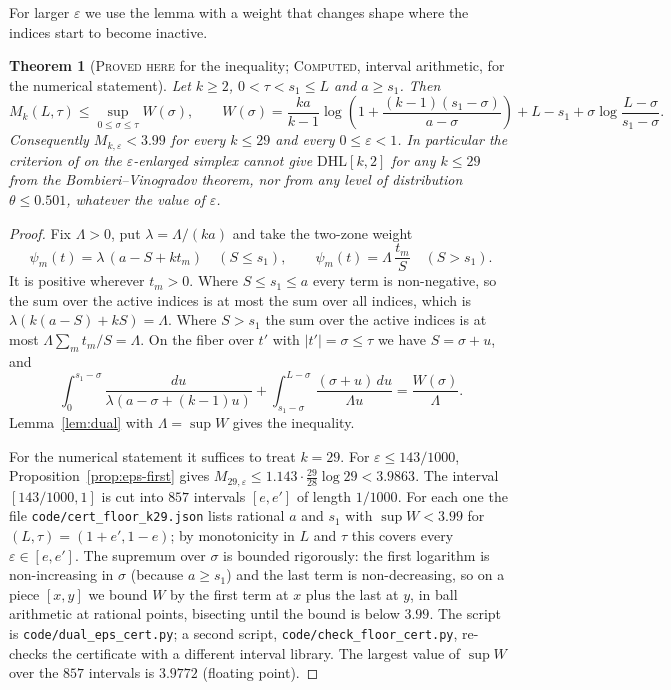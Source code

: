 \documentclass[11pt]{amsart}
\newtheorem{theorem}{Theorem}
\theoremstyle{definition}
\theoremstyle{remark}
\newcommand{\lbl}[1]{\textup{\textsc{#1}}}
\newcommand{\DHL}{\mathrm{DHL}}
\begin{document}
For larger $\varepsilon$ we use the lemma with a weight that changes shape
where the indices start to become inactive.

\begin{theorem}[\lbl{Proved here} for the inequality; \lbl{Computed}, interval arithmetic, for the numerical statement]\label{thm:floor}
Let $k\ge2$, $0<\tau<s_1\le L$ and $a\ge s_1$. Then
\[
M_k(L,\tau)\le\sup_{0\le\sigma\le\tau}W(\sigma),\qquad
W(\sigma)=\frac{ka}{k-1}\log\left(1+\frac{(k-1)(s_1-\sigma)}{a-\sigma}\right)+L-s_1+\sigma\log\frac{L-\sigma}{s_1-\sigma}.
\]
Consequently $M_{k,\varepsilon}<3.99$ for every $k\le29$ and every
$0\le\varepsilon<1$. In particular the criterion of \cite[Thm.~3.12]{Pol14b}
on the $\varepsilon$-enlarged simplex cannot give $\DHL[k,2]$ for any
$k\le29$ from the Bombieri--Vinogradov theorem, nor from any level of
distribution $\theta\le0.501$, whatever the value of $\varepsilon$.
\end{theorem}

\begin{proof}
Fix $\Lambda>0$, put $\lambda=\Lambda/(ka)$ and take the two-zone weight
\[
\psi_m(t)=\lambda\,(a-S+kt_m)\quad(S\le s_1),\qquad
\psi_m(t)=\Lambda\,\frac{t_m}{S}\quad(S>s_1).
\]
It is positive wherever $t_m>0$. Where $S\le s_1\le a$ every term is
non-negative, so the sum over the active indices is at most the sum over all
indices, which is $\lambda(k(a-S)+kS)=\Lambda$. Where $S>s_1$ the sum over the
active indices is at most $\Lambda\sum_mt_m/S=\Lambda$. On the fiber over $t'$
with $|t'|=\sigma\le\tau$ we have $S=\sigma+u$, and
\[
\int_0^{s_1-\sigma}\frac{du}{\lambda(a-\sigma+(k-1)u)}+\int_{s_1-\sigma}^{L-\sigma}\frac{(\sigma+u)\,du}{\Lambda u}=\frac{W(\sigma)}{\Lambda}.
\]
Lemma~\ref{lem:dual} with $\Lambda=\sup W$ gives the inequality.

For the numerical statement it suffices to treat $k=29$. For
$\varepsilon\le143/1000$, Proposition~\ref{prop:eps-first} gives
$M_{29,\varepsilon}\le1.143\cdot\frac{29}{28}\log29<3.9863$. The interval
$[143/1000,1]$ is cut into $857$ intervals $[e,e']$ of length $1/1000$. For
each one the file \texttt{code/cert\_floor\_k29.json} lists rational $a$ and
$s_1$ with $\sup W<3.99$ for $(L,\tau)=(1+e',1-e)$; by monotonicity in $L$ and
$\tau$ this covers every $\varepsilon\in[e,e']$. The supremum over $\sigma$ is
bounded rigorously: the first logarithm is non-increasing in $\sigma$ (because
$a\ge s_1$) and the last term is non-decreasing, so on a piece $[x,y]$ we bound
$W$ by the first term at $x$ plus the last at $y$, in ball arithmetic at
rational points, bisecting until the bound is below $3.99$. The script is
\texttt{code/dual\_eps\_cert.py}; a second script,
\texttt{code/check\_floor\_cert.py}, re-checks the certificate with a
different interval library. The largest value of $\sup W$ over the $857$
intervals is $3.9772$ (floating point).
\end{proof}
\end{document}
